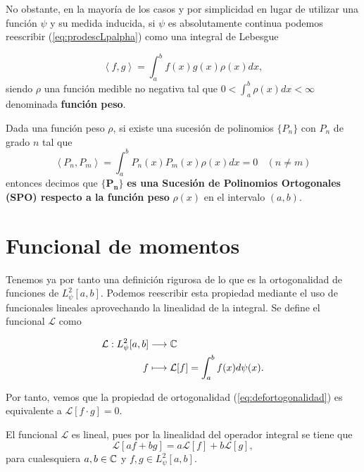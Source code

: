 No obstante, en la mayoría de los casos y por simplicidad en lugar de utilizar una función $\psi$ y su medida inducida, si $\psi$ es absolutamente continua podemos reescribir (\ref{eq:prodescLpalpha}) como una integral de Lebesgue

\begin{equation}
    \label{eq:deffuncionpeso}
    \left\langle f,g \right\rangle=\int_a^b f(x)g(x)\rho(x)dx,
\end{equation}
siendo $\rho$ una función medible no negativa tal que $0<\int_a^b\rho(x)dx<\infty$ denominada \textbf{función peso}.

\begin{definicion}
    \label{def:SPOpeso}
    Dada una función peso $\rho$, si existe una sucesión de polinomios $\{P_n\}$ con $P_n$ de grado $n$ tal que 
    $$
    \left\langle P_n,P_m \right\rangle=\int_a^b P_n(x)P_m(x)\rho(x)dx=0 \ \ \ \ (n\not=m)
    $$
    entonces decimos que $\mathbf{\{P_n\}}$ \textbf{es una Sucesión de Polinomios Ortogonales (SPO) respecto a la función peso} $\rho(x)$ en el intervalo $(a,b)$.  
\end{definicion}

\section{Funcional de momentos}

Tenemos ya por tanto una definición rigurosa de lo que es la ortogonalidad de funciones de $L^2_\psi[a,b]$. Podemos reescribir esta propiedad mediante el uso de funcionales lineales aprovechando la linealidad de la integral. Se define el funcional $\mathcal{L}$ como 

\begin{equation}
    \label{eq:funcionalLineal}
    \begin{split}
        \mathcal{L}:L_\psi^2[a,b]&\longrightarrow \mathbb{C} \\
        f&\longmapsto \mathcal{L}[f]=\int_a^b f(x)d\psi(x).
    \end{split}
\end{equation}

Por tanto, vemos que la propiedad de ortogonalidad (\ref{eq:defortogonalidad}) es equivalente a $\mathcal{L}[f\cdot g]=0$.

\begin{observacion}
    El funcional $\mathcal{L}$ es lineal, pues por la linealidad del operador integral se tiene que
    \begin{equation}
        \label{eq:linealidadfuncional}
        \mathcal{L}[a f + b g]=a\mathcal{L}[f] + b\mathcal{L}[g],
    \end{equation}
    para cualesquiera $a,b\in\mathbb{C}$ y $f,g\in L_\psi^2[a,b]$.
\end{observacion}

